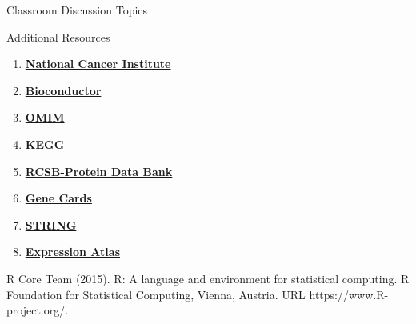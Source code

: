 \begin{frame}[t]
\begin{columns}[t]
\begin{column}{\onecolwid}
\begin{alertblock}{Classroom Discussion Topics}
\end{alertblock}
\begin{alertblock}{Additional Resources}
\begin{enumerate}
	\item \href{http://www.cancer.gov}{\textbf{National Cancer Institute}}
	\item \href{http://www.bioconductor.org}{\textbf{Bioconductor}}
	\item \href{http://www.omim.org}{\textbf{OMIM}}
	\item \href{http://www.genome.jp/kegg/}{\textbf{KEGG}}
	\item \href{http://www.rcsb.org}{\textbf{RCSB-Protein Data Bank}}
	\item \href{http://www.genecards.org}{\textbf{Gene Cards}}
	\item \href{http://string-db.org}{\textbf{STRING}}
	\item \href{http://www.ebi.ac.uk/gxa/home}{\textbf{Expression Atlas}}
\end{enumerate}
\end{alertblock}

\begin{thebibliography}{00}
\footnotesize		 		
{}R Core Team (2015). 
\newblock R: A language and environment for statistical computing. R Foundation for Statistical Computing, Vienna, Austria.
\newblock URL https://www.R-project.org/.		
\end{thebibliography}
\end{column}
\end{columns}
\end{frame}

